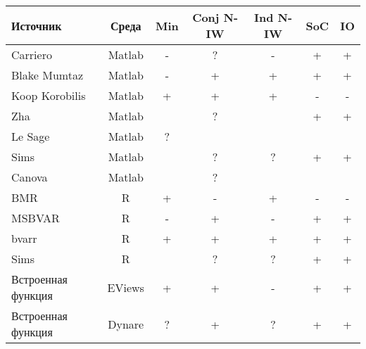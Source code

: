 \documentclass[11pt]{article} %
\begin{document}
\begin{center}
\begin{tabular}{p{4cm}cccccc}
\toprule
Источник&  Среда&Min &  Conj N-IW & Ind N-IW & SoC &IO\\
\midrule
Carriero&Matlab&-&?&-&+&+ \\
Blake Mumtaz&Matlab&-&+&+&+&+ \\
Koop Korobilis&Matlab  & + & +  & + &- &- \\
Zha&Matlab&&?&&+&+\\
Le Sage&Matlab&?&&&&\\
Sims&Matlab&&?&?&+&+\\
Canova&Matlab&&?&&&\\
BMR&R& + & - & + & - & -  \\
MSBVAR&R & - & + & - & + & +  \\
bvarr&R  & + & + & + & + & +  \\
Sims&R&&?&?&+&+\\
Встроенная функция&EViews& + & + & - &+ &+ \\
Встроенная функция&Dynare& ? & +& ?& +&+  \\
\bottomrule
\end{tabular}
\end{center}
\end{document}
